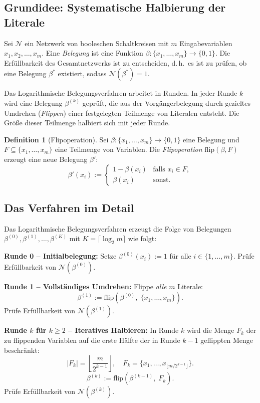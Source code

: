 ﻿\documentclass[a4paper,12pt]{article}
\theoremstyle{definition}
\newtheorem{definition}{Definition}
\begin{document}
\subsection{Grundidee: Systematische Halbierung der Literale}

Sei $\mathcal{N}$ ein Netzwerk von booleschen Schaltkreisen mit $m$ Eingabevariablen
$x_1, x_2, \ldots, x_m$. Eine \textit{Belegung} ist eine Funktion
$\beta: \{x_1, \ldots, x_m\} \to \{0, 1\}$.
Die Erfüllbarkeit des Gesamtnetzwerks ist zu entscheiden, d.\,h.\ es ist zu prüfen, ob
eine Belegung $\beta^*$ existiert, sodass $\mathcal{N}(\beta^*) = 1$.

Das Logarithmische Belegungsverfahren arbeitet in Runden. In jeder Runde $k$ wird eine
Belegung $\beta^{(k)}$ geprüft, die aus der Vorgängerbelegung durch gezieltes Umdrehen
(\textit{Flippen}) einer festgelegten Teilmenge von Literalen entsteht. Die Größe dieser
Teilmenge halbiert sich mit jeder Runde.

\begin{definition}[Flipoperation]
	Sei $\beta: \{x_1, \ldots, x_m\} \to \{0,1\}$ eine Belegung und $F \subseteq \{x_1, \ldots, x_m\}$
	eine Teilmenge von Variablen. Die \emph{Flipoperation} $\mathrm{flip}(\beta, F)$ erzeugt
	eine neue Belegung $\beta'$:
	\[
	\beta'(x_i) := \begin{cases} 1 - \beta(x_i) & \text{falls } x_i \in F, \\ \beta(x_i) & \text{sonst.} \end{cases}
	\]
\end{definition}

\subsection{Das Verfahren im Detail}

Das Logarithmische Belegungsverfahren erzeugt die Folge von Belegungen
$\beta^{(0)}, \beta^{(1)}, \ldots, \beta^{(K)}$ mit $K = \lceil \log_2 m \rceil$
wie folgt:

\medskip
\noindent\textbf{Runde 0 -- Initialbelegung:}
Setze $\beta^{(0)}(x_i) := 1$ für alle $i \in \{1, \ldots, m\}$.
Prüfe Erfüllbarkeit von $\mathcal{N}(\beta^{(0)})$.

\medskip
\noindent\textbf{Runde 1 -- Vollständiges Umdrehen:}
Flippe \emph{alle} $m$ Literale:
\[
\beta^{(1)} := \mathrm{flip}\!\left(\beta^{(0)},\; \{x_1, \ldots, x_m\}\right).
\]
Prüfe Erfüllbarkeit von $\mathcal{N}(\beta^{(1)})$.

\medskip
\noindent\textbf{Runde $k$ für $k \geq 2$ -- Iteratives Halbieren:}
In Runde $k$ wird die Menge $F_k$ der zu flippenden Variablen auf die erste Hälfte
der in Runde $k-1$ geflippten Menge beschränkt:
\[
|F_k| = \left\lfloor \frac{m}{2^{k-1}} \right\rfloor, \quad
F_k = \{x_1, \ldots, x_{\lfloor m/2^{k-1} \rfloor}\}.
\]
\[
\beta^{(k)} := \mathrm{flip}\!\left(\beta^{(k-1)},\; F_k\right).
\]
Prüfe Erfüllbarkeit von $\mathcal{N}(\beta^{(k)})$.
\end{document}
